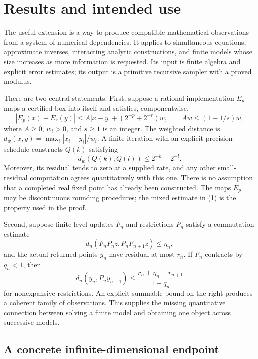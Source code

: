 \section{Results and intended use}
\label{sec:overview}

The useful extension is a way to produce compatible mathematical
observations from a system of numerical dependencies. It applies to
simultaneous equations, approximate inverses, interacting analytic
constructions, and finite models whose size increases as more information
is requested. Its input is finite algebra and explicit error estimates;
its output is a primitive recursive sampler with a proved modulus.

There are two central statements. First, suppose a rational implementation
\(E_p\) maps a certified box into itself and satisfies, componentwise,
\[
 |E_p(x)-E_r(y)|\le A|x-y|+(2^{-p}+2^{-r})w,
 \qquad Aw\le(1-1/s)w,
 \tag{1}\label{eq:overview-action}
\]
where \(A\ge0\), \(w_i>0\), and \(s\ge1\) is an integer. The weighted
distance is \(d_w(x,y)=\max_i |x_i-y_i|/w_i\). A finite iteration with an
explicit precision schedule constructs \(Q(k)\) satisfying
\[
 d_w(Q(k),Q(l))\le2^{-k}+2^{-l}.
 \tag{2}\label{eq:overview-name}
\]
Moreover, its residual tends to zero at a supplied rate, and any other
small-residual computation agrees quantitatively with this one. There
is no assumption that a completed real fixed point has already been
constructed. The maps \(E_p\) may be discontinuous rounding procedures;
the mixed estimate in (1) is the property used in the proof.

Second, suppose finite-level updates \(F_n\) and restrictions \(P_n\)
satisfy a commutation estimate
\[
 d_n(F_nP_n z,P_nF_{n+1}z)\le\eta_n,
\]
and the actual returned points \(y_n\) have residual at most \(r_n\).
If \(F_n\) contracts by \(q_n<1\), then
\[
 d_n(y_n,P_ny_{n+1})\le
 \frac{r_n+\eta_n+r_{n+1}}{1-q_n}
 \tag{3}\label{eq:overview-refinement}
\]
for nonexpansive restrictions. An explicit summable bound on the right
produces a coherent family of observations. This supplies the missing
quantitative connection between solving a finite model and obtaining one
object across successive models.

\subsection{A concrete infinite-dimensional endpoint}

